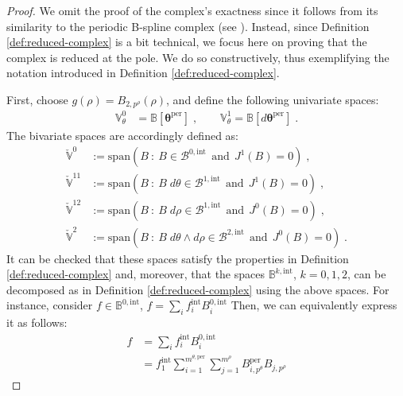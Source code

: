 \documentclass[10pt]{article}
\newcommand{\mbf}[1]{{\boldsymbol{#1}}}
\newcommand{\spaceSpan}[1]{\ensuremath{\text{span}}\left(#1\right)}
\newcommand{\basis}[1]{\mathcal{#1}}
\newcommand{\vSpace}[1]{\mathbb{#1}}
\newcommand{\cU}{\theta}
\newcommand{\cV}{\rho}
\newcommand{\dcU}{\mathit{d\cU}}
\newcommand{\dcV}{\mathit{d\cV}}
\newcommand{\degU}{p^\cU}
\newcommand{\degV}{p^\cV}
\newcommand{\kntU}{\cU}
\newcommand{\kntsU}{\mbf{\kntU}}
\newcommand{\pkntsU}{\kntsU^\per}
\newcommand{\ndofV}{m^\cV}
\newcommand{\bsp}{B}
\newcommand{\bspB}{\basis{\bsp}}
\newcommand{\bspS}{\vSpace{\bsp}}
\newcommand{\per}{\mathrm{per}}
\newcommand{\pndofU}{m^{\cU,\per}}
\newcommand{\jet}[2]{J^{#1}\left(#2\right)}
\newcommand{\tint}{\mathrm{int}}
\theoremstyle{plain}
\theoremstyle{definition}
\theoremstyle{remark}
\begin{document}
\begin{proof}
    We omit the proof of the complex's exactness since it follows from its similarity to the periodic B-spline complex (see ).
    Instead, since Definition \ref{def:reduced-complex} is a bit technical, we focus here on proving that the complex is reduced at the pole.
    We do so constructively, thus exemplifying the notation introduced in Definition \ref{def:reduced-complex}.
    
    First, choose $g(\cV) = \bsp_{2,\degV}(\cV)$, and define the following univariate spaces:
    \begin{equation*}
        \begin{split}
            \vSpace{V}^0_\cU &= \bspS[\pkntsU]\;,\qquad
            \vSpace{V}^1_\cU = \bspS[d\pkntsU]\;.
        \end{split}
    \end{equation*}
    The bivariate spaces are accordingly defined as:
    \begin{equation*}
        \begin{split}
            \check{\vSpace{V}}^0 &:= \spaceSpan{B~:~B \in \bspB^{0,\tint}
            ~~\text{and}~~
            \jet{1}{B} = 0}\;,\\
            \check{\vSpace{V}}^{11} &:= \spaceSpan{B~:~B\;\dcU \in \bspB^{1,\tint}
            ~~\text{and}~~
            \jet{1}{B} = 0}\;,\\
            \check{\vSpace{V}}^{12} &:= \spaceSpan{B~:~B\;\dcV \in \bspB^{1,\tint}
            ~~\text{and}~~
            \jet{0}{B} = 0}\;,\\
            \check{\vSpace{V}}^2 &:= \spaceSpan{B~:~B\;\dcU\wedge\dcV \in \bspB^{2,\tint}
            ~~\text{and}~~
            \jet{0}{B} = 0}\;.
        \end{split}
    \end{equation*}
    It can be checked that these spaces satisfy the properties in Definition \ref{def:reduced-complex} and, moreover, that the spaces $\bspS^{k,\tint}$, $k = 0, 1, 2$, can be decomposed as in Definition \ref{def:reduced-complex} using the above spaces.
    For instance, consider $f \in \bspS^{0,\tint}$, $f = \sum_{i} f_i^\tint \bsp^{0,\tint}_i$
    Then, we can equivalently express it as follows:
    \begin{equation*}
        \begin{split}
            f &= \sum_{i} f_i^\tint \bsp^{0,\tint}_i\;\\
        &= f_1^\tint\sum_{i=1}^{\pndofU}\sum_{j = 1}^{\ndofV}\bsp^{\per}_{i,\degU}\bsp_{j,\degV}

\end{split}
\end{equation*}
\end{proof}
\end{document}
